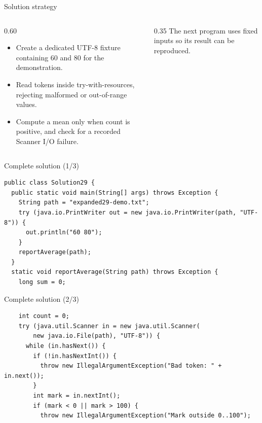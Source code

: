 \documentclass[10pt,aspectratio=169]{beamer}
\begin{document}
\begin{frame}[fragile,t]{Solution strategy}
\begin{columns}[T,onlytextwidth]\begin{column}{0.60\textwidth}
\begin{itemize}
\item Create a dedicated UTF-8 fixture containing 60 and 80 for the demonstration.
\item Read tokens inside try-with-resources, rejecting malformed or out-of-range values.
\item Compute a mean only when count is positive, and check for a recorded Scanner I/O failure.
\end{itemize}
\end{column}\begin{column}{0.35\textwidth}\small
The next program uses fixed inputs so its result can be reproduced.
\end{column}\end{columns}
\end{frame}

\begin{frame}[fragile,t]{Complete solution (1/3)}
\begin{lstlisting}
public class Solution29 {
  public static void main(String[] args) throws Exception {
    String path = "expanded29-demo.txt";
    try (java.io.PrintWriter out = new java.io.PrintWriter(path, "UTF-8")) {
      out.println("60 80");
    }
    reportAverage(path);
  }
  static void reportAverage(String path) throws Exception {
    long sum = 0;
\end{lstlisting}
\end{frame}

\begin{frame}[fragile,t]{Complete solution (2/3)}
\begin{lstlisting}
    int count = 0;
    try (java.util.Scanner in = new java.util.Scanner(
        new java.io.File(path), "UTF-8")) {
      while (in.hasNext()) {
        if (!in.hasNextInt()) {
          throw new IllegalArgumentException("Bad token: " + in.next());
        }
        int mark = in.nextInt();
        if (mark < 0 || mark > 100) {
          throw new IllegalArgumentException("Mark outside 0..100");
\end{lstlisting}
\end{frame}
\end{document}
